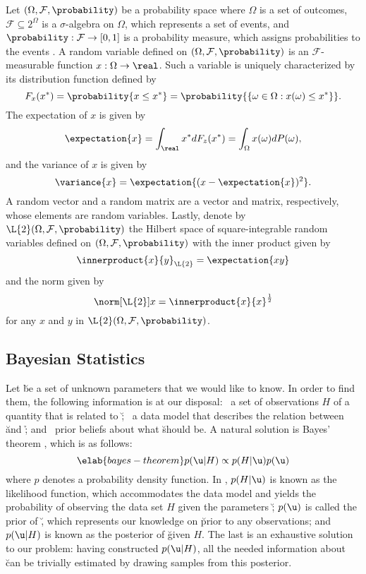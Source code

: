 Let $(\Omega, \mathcal{F}, \probability)$ be a probability space where $\Omega$
is a set of outcomes, $\mathcal{F} \subseteq 2^\Omega$ is a $\sigma$-algebra on
$\Omega$, which represents a set of events, and $\probability: \mathcal{F} \to
[0, 1]$ is a probability measure, which assigns probabilities to the events
\cite{durrett2010}. A random variable defined on $(\Omega, \mathcal{F},
\probability)$ is an $\mathcal{F}$-measurable function $x: \Omega \to \real$.
Such a variable is uniquely characterized by its distribution function defined
by
\begin{equation*}
  F_x(x^*) = \probability{x \leq x^*} = \probability{\{ \omega \in \Omega: x(\omega) \leq x^* \}}.
\end{equation*}
The expectation of $x$ is given by
\[
  \expectation{x} = \int_\real x^* dF_z(x^*) = \int_\Omega x(\omega) dP(\omega),
\]
and the variance of $x$ is given by
\[
  \variance{x} = \expectation{(x - \expectation{x})^2}.
\]
A random vector and a random matrix are a vector and matrix, respectively, whose
elements are random variables. Lastly, denote by $\L{2}(\Omega, \mathcal{F},
\probability)$ the Hilbert space of square-integrable random variables
\cite{janson1997} defined on $(\Omega, \mathcal{F}, \probability)$ with the
inner product given by
\[
  \innerproduct{x}{y}_\L{2} = \expectation{x y}
\]
and the norm given by
\[
  \norm[\L{2}]{x} = \innerproduct{x}{x}^\frac{1}{2}
\]
for any $x$ and $y$ in $\L{2}(\Omega, \mathcal{F}, \probability)$.

\subsection{Bayesian Statistics}

Let \u be a set of unknown parameters that we would like to know. In order to
find them, the following information is at our disposal: \one~a set of
observations $H$ of a quantity \h that is related to \u; \two~a data model that
describes the relation between \u and \h; and \three~prior beliefs about what \u
should be. A natural solution is Bayes' theorem \cite{gelman2004}, which is as
follows:
\begin{equation} \elab{bayes-theorem}
  p(\u | H) \propto p(H | \u) p(\u)
\end{equation}
where $p$ denotes a probability density function. In , $p(H
| \u)$ is known as the likelihood function, which accommodates the data model
and yields the probability of observing the data set $H$ given the parameters
\u; $p(\u)$ is called the prior of \u, which represents our knowledge on \u
prior to any observations; and $p(\u | H)$ is known as the posterior of \u given
$H$. The last is an exhaustive solution to our problem: having constructed $p(\u
| H)$, all the needed information about \u can be trivially estimated by drawing
samples from this posterior.

